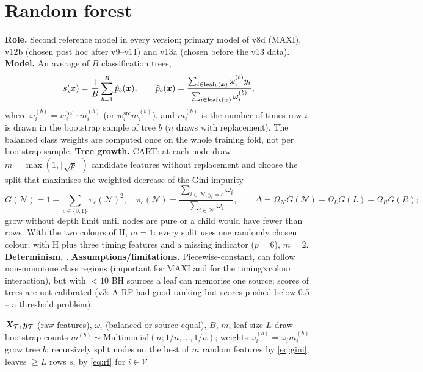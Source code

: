 \section{Random forest}\label{sec:rf}
\textbf{Role.} Second reference model in every version; primary model of v8d (MAXI), v12b (chosen post hoc after
v9--v11) and v13a (chosen before the v13 data). \textbf{Model.} An average of $B$ classification trees,
\begin{equation}
s(\bm{x}) = \frac1B\sum_{b=1}^{B}\hat p_b(\bm{x}),\qquad
\hat p_b(\bm{x})=\frac{\sum_{i\in\mathrm{leaf}_b(\bm{x})}\omega^{(b)}_i y_i}{\sum_{i\in\mathrm{leaf}_b(\bm{x})}\omega^{(b)}_i},\label{eq:rf}
\end{equation}
where $\omega^{(b)}_i = w^{\mathrm{bal}}_i\cdot m^{(b)}_i$ (or $w^{\mathrm{src}}_i m^{(b)}_i$), and $m^{(b)}_i$ is the
number of times row $i$ is drawn in the bootstrap sample of tree $b$ ($n$ draws with replacement). The balanced class
weights are computed once on the whole training fold, not per bootstrap sample. \textbf{Tree growth.} CART: at each node
draw $m=\max(1,\lfloor\sqrt p\rfloor)$ candidate features without replacement and choose the split that maximises the
weighted decrease of the Gini impurity
\begin{equation}
G(\mathcal N) = 1-\sum_{c\in\{0,1\}}\pi_c(\mathcal N)^2,\quad \pi_c(\mathcal N)=\frac{\sum_{i\in\mathcal N,y_i=c}\omega_i}{\sum_{i\in\mathcal N}\omega_i},\qquad
\Delta = \Omega_\mathcal{N} G(\mathcal N) - \Omega_{L}G(L) - \Omega_{R}G(R);\label{eq:gini}
\end{equation}
grow without depth limit until nodes are pure or a child would have fewer than  rows.
With the two colours of H, $m=1$: every split uses one randomly chosen colour; with H plus three timing features and a
missing indicator ($p=6$), $m=2$. \textbf{Determinism.} . \textbf{Assumptions/limitations.}
Piecewise-constant, can follow non-monotone class regions (important for MAXI and for the timing$\times$colour
interaction), but with $<10$ BH sources a leaf can memorise one source; scores of trees are not calibrated (v3: A-RF had
good ranking but scores pushed below 0.5 -- a threshold problem).

\begin{algorithm}[htbp]
\caption{Random forest fit and score (one fold)}\label{alg:rf}
\begin{algorithmic}[1]
\Require $\bm{X}_\mathcal{T},\bm{y}_\mathcal{T}$ (raw features), $\omega_i$ (balanced or source-equal), $B$, $m$, leaf size $L$
 
  \State draw bootstrap counts $m^{(b)}\sim\mathrm{Multinomial}(n; 1/n,\dots,1/n)$; weights $\omega^{(b)}_i=\omega_i m^{(b)}_i$
  \State grow tree $b$: recursively split nodes on the best of $m$ random features by \cref{eq:gini}, leaves $\ge L$ rows
\EndFor
\State \Return $s_i$ by \cref{eq:rf} for $i\in\mathcal V$
\end{algorithmic}
\end{algorithm}

